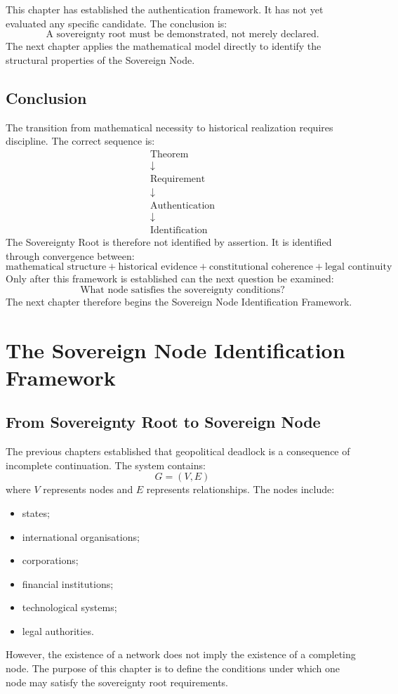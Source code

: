 \documentclass[11pt,openany]{book}
\theoremstyle{plain}
\theoremstyle{definition}
\begin{document}
This chapter has established the authentication framework. It has not yet evaluated any specific candidate. The conclusion is:
\[
\boxed{
\text{A sovereignty root must be demonstrated, not merely declared.}
}
\]
The next chapter applies the mathematical model directly to identify the structural properties of the Sovereign Node.

\section{Conclusion}

The transition from mathematical necessity to historical realization requires discipline. The correct sequence is:
\[
\begin{gathered}
\text{Theorem} \\
\downarrow \\
\text{Requirement} \\
\downarrow \\
\text{Authentication} \\
\downarrow \\
\text{Identification}
\end{gathered}
\]
The Sovereignty Root is therefore not identified by assertion. It is identified through convergence between:
\[
\boxed{
\text{mathematical structure} + \text{historical evidence} + \text{constitutional coherence} + \text{legal continuity}
}
\]
Only after this framework is established can the next question be examined:
\[
\boxed{
\text{What node satisfies the sovereignty conditions?}
}
\]
The next chapter therefore begins the Sovereign Node Identification Framework.


\chapter{The Sovereign Node Identification Framework}

\section{From Sovereignty Root to Sovereign Node}

The previous chapters established that geopolitical deadlock is a consequence of incomplete continuation. The system contains:
\[
G = (V, E)
\]
where \(V\) represents nodes and \(E\) represents relationships. The nodes include:
\begin{itemize}
\item states;
\item international organisations;
\item corporations;
\item financial institutions;
\item technological systems;
\item legal authorities.
\end{itemize}
However, the existence of a network does not imply the existence of a completing node. The purpose of this chapter is to define the conditions under which one node may satisfy the sovereignty root requirements.
\end{document}
